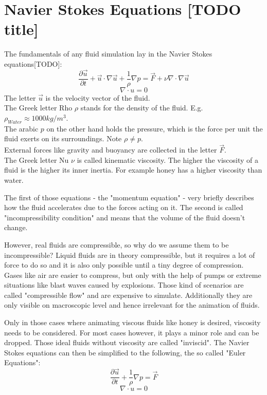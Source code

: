 \chapter{Navier Stokes Equations [TODO title]}\label{chapter:cudapressuresolver}

The fundamentals of any fluid simulation lay in the Navier Stokes equations[TODO]:\\
\begin{equation} \label{navier-stokes1}
	\frac{\partial \vec{u}}{\partial t} + \vec{u} \cdot \nabla \vec{u} + \frac{1}{\rho}  \nabla p = \vec{F} + \nu \nabla \cdot \nabla \vec{u}
\end{equation}
\begin{equation} \label{navier-stokes2}
	\nabla \cdot u = 0
\end{equation}
The letter $\vec{u}$ is the velocity vector of the fluid.\\
The Greek letter Rho $\rho$ stands for the density of the fluid. E.g. $\rho_{Water} \approx 1000 kg/m^3$. \\
The arabic $p$ on the other hand holds the pressure, which is the force per unit the fluid exerts on its surroundings. Note $\rho \neq p$.\\
External forces like gravity and buoyancy are collected in the letter $\vec{F}$.\\
The Greek letter Nu $\nu$ is called kinematic viscosity. The higher the viscosity of a fluid is the higher its inner inertia. For example honey has a higher viscosity than water.\\
\par The first of those equations - the "momentum equation" - very briefly describes how the fluid accelerates due to the forces acting on it. The second is called "incompressibility condition" and means that the volume of the fluid doesn't change.
\par However, real fluids are compressible, so why do we assume them to be incompressible? Liquid fluids are in theory compressible, but it requires a lot of force to do so and it is also only possible until a tiny degree of compression. Gases like air are easier to compress, but only with the help of pumps or extreme situations like blast waves caused by explosions. Those kind of scenarios are called "compressible flow" and are expensive to simulate. Additionally they are only visible on macroscopic level and hence irrelevant for the animation of fluids.
\par Only in those cases where animating viscous fluids like honey is desired, viscosity needs to be considered. For most cases however, it plays a minor role and can be dropped. Those ideal fluids without viscosity are called "inviscid". The Navier Stokes equations can then be simplified to the following, the so called "Euler Equations":
\begin{equation} \label{euler-equation1}
	\frac{\partial \vec{u}}{\partial t} + \frac{1}{\rho}  \nabla p = \vec{F}
\end{equation}
\begin{equation} \label{euler-equation2}
	\nabla \cdot u = 0
\end{equation}

